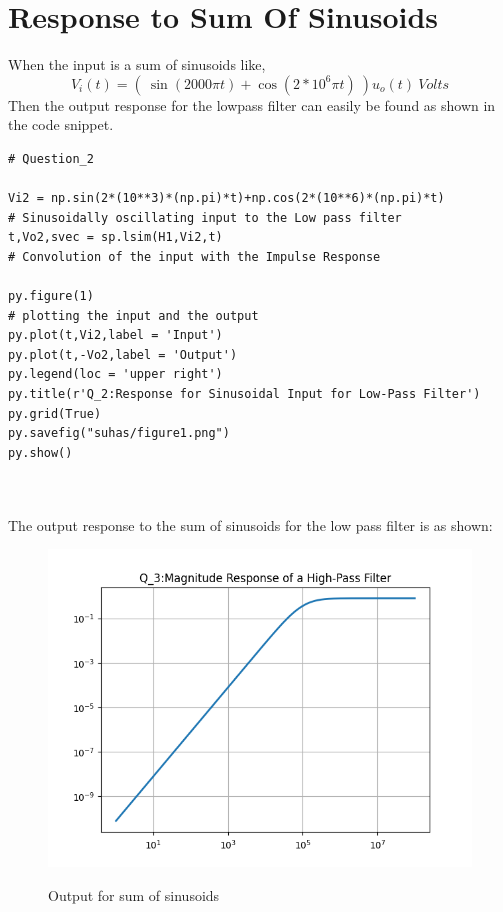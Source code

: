 \documentclass[11pt, a4paper]{article}
\begin{document}
\section*{Response to Sum Of Sinusoids}   
    When the input is a sum of sinusoids like,
\begin{equation*}
  V_{i}(t) = ( \ \sin(2000\pi t) + \cos(2*10^{6}\pi t) \ )u_{o}(t) \ Volts
  \end{equation*}
  Then the output response for the lowpass filter can easily be found as shown in the code snippet.
\begin{verbatim}
# Question_2 

Vi2 = np.sin(2*(10**3)*(np.pi)*t)+np.cos(2*(10**6)*(np.pi)*t)                            # Sinusoidally oscillating input to the Low pass filter
t,Vo2,svec = sp.lsim(H1,Vi2,t)                                                           # Convolution of the input with the Impulse Response

py.figure(1)                                                                             # plotting the input and the output
py.plot(t,Vi2,label = 'Input')
py.plot(t,-Vo2,label = 'Output')
py.legend(loc = 'upper right')
py.title(r'Q_2:Response for Sinusoidal Input for Low-Pass Filter')
py.grid(True)
py.savefig("suhas/figure1.png")
py.show()



\end{verbatim}
The output response to the sum of sinusoids for the low pass filter is as shown:
\begin{figure}[!tbh]
   	\centering
   	\includegraphics[width=1.0\textwidth]{Figure2.png}
   	\label{fig:32}
   	\caption{Output for sum of sinusoids}
   \end{figure}
   \newpage
\end{document}
